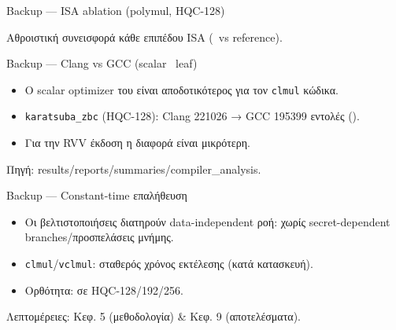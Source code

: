 \documentclass[aspectratio=169,10pt]{beamer}
\begin{document}
\begin{frame}{Backup — ISA ablation (polymul, HQC-128)}
  \begin{center}
  \end{center}
  \centering\footnotesize\textcolor{neutral}{Αθροιστική συνεισφορά κάθε επιπέδου ISA (\instret\ vs reference).}
\end{frame}

\begin{frame}{Backup — Clang vs GCC (scalar \Zbc\ leaf)}
  \begin{itemize}
    \item Ο scalar optimizer του  είναι αποδοτικότερος για τον \texttt{clmul} κώδικα.
    \item \texttt{karatsuba\_zbc} (HQC-128): Clang \num{221026} → GCC \num{195399} εντολές ().
    \item Για την RVV έκδοση η διαφορά είναι μικρότερη.
  \end{itemize}
  \centering\footnotesize\textcolor{neutral}{Πηγή: results/reports/summaries/compiler\_analysis.}
\end{frame}

\ifincludeCT
\begin{frame}{Backup — Constant-time επαλήθευση}
  \begin{itemize}
    \item Οι βελτιστοποιήσεις διατηρούν data-independent ροή: χωρίς secret-dependent branches/προσπελάσεις μνήμης.
    \item \texttt{clmul}/\texttt{vclmul}: σταθερός χρόνος εκτέλεσης (κατά κατασκευή).
    \item Ορθότητα:  σε HQC-128/192/256.
  \end{itemize}
  \centering\footnotesize\textcolor{neutral}{Λεπτομέρειες: Κεφ. 5 (μεθοδολογία) \& Κεφ. 9 (αποτελέσματα).}
\end{frame}
\fi
\end{document}
